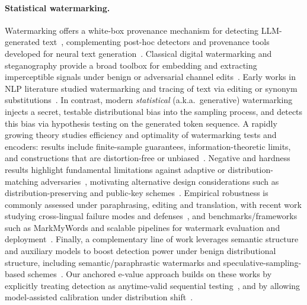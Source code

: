 \paragraph{Statistical watermarking.}
Watermarking offers a white-box provenance mechanism for detecting LLM-generated text~\citep{tang2023science}, complementing post-hoc detectors and provenance tools developed for neural text generation~\citep{zellers2019defending}.
Classical digital watermarking and steganography provide a broad toolbox for embedding and extracting imperceptible signals under benign or adversarial channel edits~\citep{cox2007digital}. Early works in NLP literature studied watermarking and tracing of text via editing or synonym substitutions~\citep{venugopal-etal-2011-watermarking,rizzo2019fine,abdelnabi2021adversarial,yang2022tracing,kamaruddin2018review}.
In contrast, modern \emph{statistical} (a.k.a.\ generative) watermarking~\citep{aaronson2022my,kirchenbauer2023watermark} injects a secret, testable distributional bias into the sampling process, and detects this bias via hypothesis testing on the generated token sequence.
A rapidly growing theory studies efficiency and optimality of watermarking tests and encoders: results include finite-sample guarantees, information-theoretic limits, and constructions that are distortion-free or unbiased~\citep{huang2023towards,zhao2023provable,li2024statistical,block2025gaussmark,kuditipudi2023robust,hu2023unbiased,xie2025debiasing}.
Negative and hardness results highlight fundamental limitations against adaptive or distribution-matching adversaries~\citep{christ2023undetectable,christ2024pseudorandom,golowich2024edit}, motivating alternative design considerations such as distribution-preserving and public-key  schemes~\citep{wu2023distributionpreserving,liu2023unforgeable,fairoze2023publiclydetectable}.
Empirical robustness is commonly assessed under paraphrasing, editing and translation, with recent work studying cross-lingual failure modes and defenses~\citep{he2024translation}, and benchmarks/frameworks such as MarkMyWords and scalable pipelines for watermark evaluation and deployment~\citep{piet2023mark,zhang2024remarkllm,lau2024waterfall,dathathri2024scalable}.
Finally, a complementary line of work leverages semantic structure and auxiliary models to boost detection power under benign distributional structure, including semantic/paraphrastic watermarks and speculative-sampling-based schemes~\citep{ren2024robustsemanticsbasedwatermarklarge,liu2024adaptive,hou2024k,hou2024semstampsemanticwatermarkparaphrastic,fu2024watermarking,huang2025watermarking,leviathan2023fast}.
Our anchored e-value approach builds on these works by explicitly treating detection as anytime-valid sequential testing~\citep{chen2024online}, and by allowing model-assisted calibration under distribution shift~\citep{huang2025watermarking,he2024distributionadaptive,he2025distributionalembedding}.


